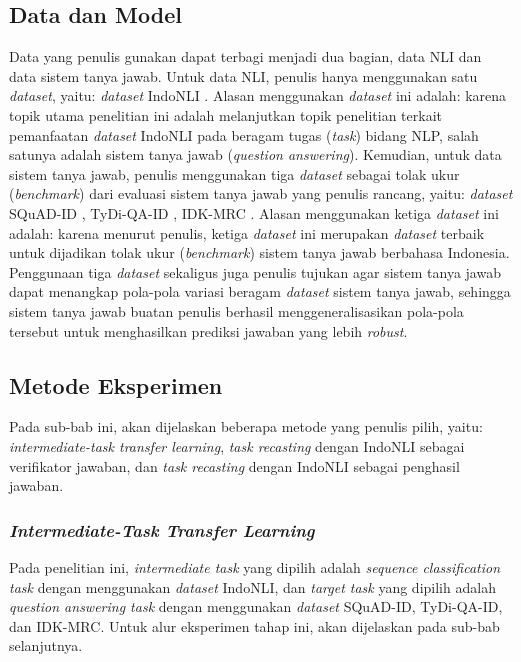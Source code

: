 \subsection{Data dan Model}
Data yang penulis gunakan dapat terbagi menjadi dua bagian, data NLI dan data sistem tanya jawab. Untuk data NLI, penulis hanya menggunakan satu \emph{dataset}, yaitu: \emph{dataset} IndoNLI \citep{mahendra-etal-2021-indonli}. Alasan menggunakan \emph{dataset} ini adalah: karena topik utama penelitian ini adalah melanjutkan topik penelitian \citet{mahendra-etal-2021-indonli} terkait pemanfaatan \emph{dataset} IndoNLI pada beragam tugas (\emph{task}) bidang NLP, salah satunya adalah sistem tanya jawab (\emph{question answering}). Kemudian, untuk data sistem tanya jawab, penulis menggunakan tiga \emph{dataset} sebagai tolak ukur (\emph{benchmark}) dari evaluasi sistem tanya jawab yang penulis rancang, yaitu: \emph{dataset} SQuAD-ID \citep{muis2020sequencetosequence}, TyDi-QA-ID \citep{cahyawijaya-etal-2021-indonlg}, IDK-MRC \citep{putri-oh-2022-idk}. Alasan menggunakan ketiga \emph{dataset} ini adalah: karena menurut penulis, ketiga \emph{dataset} ini merupakan \emph{dataset} terbaik untuk dijadikan tolak ukur (\emph{benchmark}) sistem tanya jawab berbahasa Indonesia. Penggunaan tiga \emph{dataset} sekaligus juga penulis tujukan agar sistem tanya jawab dapat menangkap pola-pola variasi beragam \emph{dataset} sistem tanya jawab, sehingga sistem tanya jawab buatan penulis berhasil menggeneralisasikan pola-pola tersebut untuk menghasilkan prediksi jawaban yang lebih \emph{robust}.

\subsection{Metode Eksperimen}
Pada sub-bab ini, akan dijelaskan beberapa metode yang penulis pilih, yaitu: \emph{intermediate-task transfer learning}, \emph{task recasting} dengan IndoNLI sebagai verifikator jawaban, dan \emph{task recasting} dengan IndoNLI sebagai penghasil jawaban. 

\subsubsection{\emph{Intermediate-Task Transfer Learning}}
Pada penelitian ini, \emph{intermediate task} yang dipilih adalah \emph{sequence classification task} dengan menggunakan \emph{dataset} IndoNLI, dan \emph{target task} yang dipilih adalah \emph{question answering task} dengan menggunakan \emph{dataset} SQuAD-ID, TyDi-QA-ID, dan IDK-MRC. Untuk alur eksperimen tahap ini, akan dijelaskan pada sub-bab selanjutnya.

